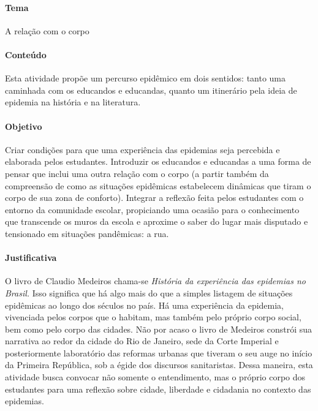 \documentclass[12pt]{extarticle}
\begin{document}

\paragraph{Tema} A relação com o corpo

\paragraph{Conteúdo}

Esta atividade propõe um percurso epidêmico em dois sentidos: tanto uma
caminhada com os educandos e educandas, quanto um itinerário pela ideia
de epidemia na história e na literatura.

\paragraph{Objetivo}

Criar condições para que uma experiência das epidemias seja percebida e
elaborada pelos estudantes. Introduzir os educandos e educandas a uma
forma de pensar que inclui uma outra relação com o corpo (a partir
também da compreensão de como as situações epidêmicas estabelecem
dinâmicas que tiram o corpo de sua zona de conforto). Integrar a
reflexão feita pelos estudantes com o entorno da comunidade escolar,
propiciando uma ocasião para o conhecimento que transcende os muros da
escola e aproxime o saber do lugar mais disputado e tensionado em
situações pandêmicas: a rua.

\paragraph{Justificativa}

O livro de Claudio Medeiros chama-se \emph{História da experiência das
epidemias no Brasil.} Isso significa que há algo mais do que a simples
listagem de situações epidêmicas ao longo dos séculos no país. Há uma
experiência da epidemia, vivenciada pelos corpos que o habitam, mas
também pelo próprio corpo social, bem como pelo corpo das cidades. Não
por acaso o livro de Medeiros constrói sua narrativa ao redor da cidade
do Rio de Janeiro, sede da Corte Imperial e posteriormente laboratório
das reformas urbanas que tiveram o seu auge no início da Primeira
República, sob a égide dos discursos sanitaristas. Dessa maneira, esta
atividade busca convocar não somente o entendimento, mas o próprio corpo
dos estudantes para uma reflexão sobre cidade, liberdade e cidadania no
contexto das epidemias.
\end{document}
